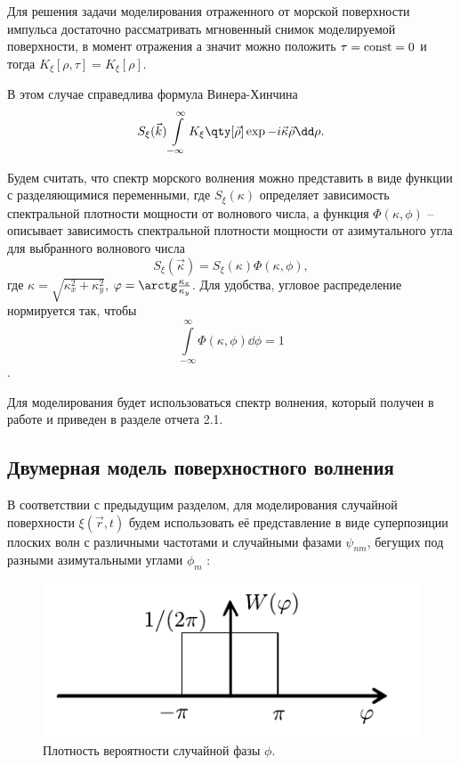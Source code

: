 Для решения задачи моделирования отраженного от морской поверхности импульса
достаточно рассматривать мгновенный снимок моделируемой поверхности, в момент
отражения
а значит можно положить $\tau = \text{\rmfamily\upshape const} = 0$  и  тогда $K_\xi[\rho,\tau] = K_\xi [\rho]$.

В этом случае справедлива формула Винера-Хинчина \cite{cite:10}
\begin{equation}
    \label{eq:Viner-Hinchin}
    S_\xi(\vec k) \int\limits_{-\infty}^{\infty} K_\xi \qty[\vec \rho] \exp{- i
    \vec \kappa \vec \rho} \dd \rho. 
\end{equation}


Будем считать, что спектр морского волнения можно представить в виде функции с
разделяющимися переменными, где $S_{\xi}(\kappa)$ определяет зависимость
спектральной плотности мощности от волнового числа, а функция $\Phi(\kappa, \phi)$ -- 
описывает зависимость спектральной плотности мощности от азимутального угла для
выбранного волнового числа
\begin{equation}
    S_\xi(\vec \kappa) = S_\xi(\kappa) \Phi(\kappa, \phi),
\end{equation}
где $\kappa = \sqrt{\kappa_x^2 + \kappa_y^2}$,  $\phi = \arctg
\frac{\kappa_x}{\kappa_y}$. Для
удобства, угловое распределение нормируется так, чтобы
$$\int\limits_{-\infty}^{\infty} \Phi(\kappa,\phi) \dd
\phi = 1$$.


Для моделирования будет использоваться спектр волнения, который получен в
работе \cite{cite:6} и приведен в разделе отчета 2.1.

\subsection{Двумерная модель поверхностного волнения}%
\label{sec:dvumernaia_model_poverkhnostnogo_volneniia}

В соответствии с предыдущим разделом, для моделирования случайной поверхности
$\xi(\vec r,t)$ будем использовать её представление в виде суперпозиции
плоских волн с различными частотами и случайными фазами $\psi_{nm}$, бегущих
под разными азимутальными углами $\phi_m$ \cite{cite:11}:
\begin{figure}[H]
    \centering
    \includegraphics[scale=1]{fig/image65}
    \caption{Плотность вероятности случайной фазы $\phi$.}
    \label{fig:phase}
\end{figure}

